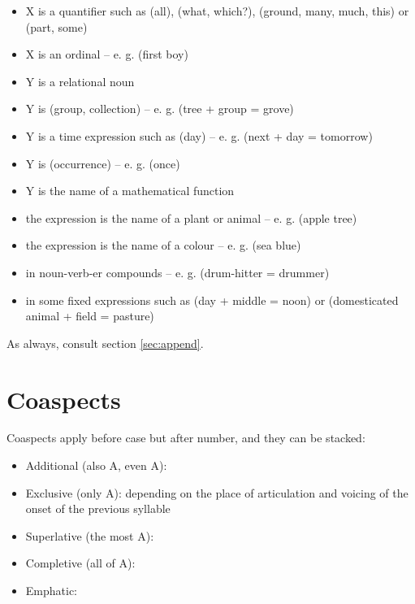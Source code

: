 \documentclass{book}
\begin{document}
\begin{itemize}
    \item X is a quantifier such as  (all),  (what, which?),  (ground, many, much, this) or  (part, some)
    \item X is an ordinal -- e. g.  (first boy)
    \item Y is a relational noun
    \item Y is  (group, collection) -- e. g.  (tree + group = grove)
    \item Y is a time expression such as  (day) -- e. g.  (next + day = tomorrow)
    \item Y is  (occurrence) -- e. g.  (once)
    \item Y is the name of a mathematical function
    \item the expression is the name of a plant or animal -- e. g.  (apple tree)
    \item the expression is the name of a colour -- e. g.  (sea blue)
    \item in noun-verb-er compounds -- e. g.  (drum-hitter = drummer)
    \item in some fixed expressions such as  (day + middle = noon) or  (domesticated animal + field = pasture)
\end{itemize}

As always, consult section \ref{sec:append}.

\section{Coaspects}

Coaspects apply before case but after number, and they can be stacked:

\begin{itemize}
    \item Additional (also A, even A): 
    \item Exclusive (only A):  depending on the place of articulation and voicing of the onset of the previous syllable
    \item Superlative (the most A): 
    \item Completive (all of A): 
    \item Emphatic: 
\end{itemize}
\end{document}
